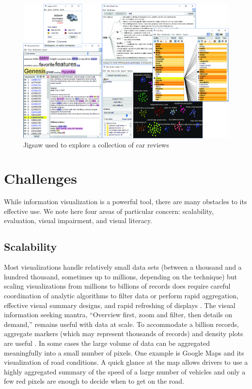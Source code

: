 \documentclass[]{krantz}
\begin{document}
\begin{figure}

{\centering \includegraphics[width=0.9\linewidth]{ChapterViz/figures/fig9-11} 

}

\caption{Jigsaw used to explore a collection of car reviews}\label{fig:fig9-11}
\end{figure}

\section{Challenges}\label{sec:viz-4}

While information visualization is a powerful tool, there are many
obstacles to its effective use. We note here four areas of particular
concern: scalability, evaluation, visual impairment, and visual
literacy.

\subsection{Scalability}\label{sec:viz-4.1}

Most visualizations handle relatively small data sets (between a
thousand and a hundred thousand, sometimes up to millions, depending on
the technique) but scaling visualizations from millions to billions of
records does require careful coordination of analytic algorithms to
filter data or perform rapid aggregation, effective visual summary
designs, and rapid refreshing of displays
\citep{shneiderman2008extreme}. The visual information seeking mantra,
``Overview first, zoom and filter, then details on demand,'' remains
useful with data at scale. To accommodate a billion records, aggregate
markers (which may represent thousands of records) and density plots are
useful \citep{dunne2013motif}. In some cases the large volume of data
can be aggregated meaningfully into a small number of pixels. One
example is Google Maps and its visualization of road conditions. A quick
glance at the map allows drivers to use a highly aggregated summary of
the speed of a large number of vehicles and only a few red pixels are
enough to decide when to get on the road.
\end{document}
